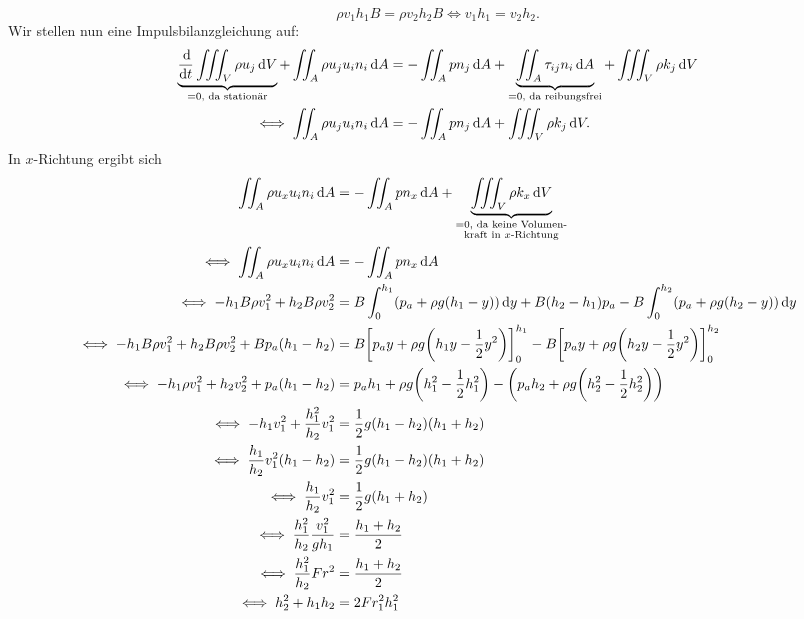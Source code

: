 \documentclass{exercise}
\begin{document}
\begin{enumerate}
        \[
            \rho v_1 h_1 B = \rho v_2 h_2 B \iff v_1 h_1 = v_2 h_2.
        \]
        Wir stellen nun eine Impulsbilanzgleichung auf:
        \begin{align*}
            \underbrace{\frac{\d}{\d t}\iiint_V \rho u_j\d V}_{= 0\text{, da stationär}} + \iint_A \rho u_j u_i n_i\d A &= -\iint_A pn_j\d A + \underbrace{\iint_A \tau_{ij}n_i\d A}_{= 0\text{, da reibungsfrei}} + \iiint_V \rho k_j\d V\\
            \iff \iint_A \rho u_j u_i n_i\d A &= -\iint_A pn_j\d A + \iiint_V \rho k_j\d V.
        \end{align*}
        In \(x\)-Richtung ergibt sich
        \begin{align*}
            \iint_A \rho u_x u_i n_i\d A &= -\iint_A pn_x\d A + \underbrace{\iiint_V \rho k_x\d V}_{\substack{= 0\text{, da keine Volumen-}\\\text{kraft in }x\text{-Richtung}}}\\
            \iff \iint_A \rho u_x u_i n_i\d A &= -\iint_A pn_x\d A\\
            \iff -h_1 B\rho v_1^2 + h_2 B\rho v_2^2 &= B\int_0^{h_1}\parentheses*{p_a + \rho g\parentheses*{h_1 - y}}\d y + B\parentheses*{h_2 - h_1}p_a - B\int_0^{h_2}\parentheses*{p_a + \rho g\parentheses*{h_2 - y}}\d y\\
            \iff -h_1 B\rho v_1^2 + h_2 B\rho v_2^2 + Bp_a\parentheses*{h_1 - h_2} &= B\brackets*{p_a y + \rho g\parentheses*{h_1 y - \frac{1}{2}y^2}}_0^{h_1} - B\brackets*{p_a y + \rho g\parentheses*{h_2 y - \frac{1}{2}y^2}}_0^{h_2}\\
            \iff -h_1 \rho v_1^2 + h_2 v_2^2 + p_a\parentheses*{h_1 - h_2} &= p_a h_1 + \rho g\parentheses*{h_1^2 - \frac{1}{2}h_1^2} - \parentheses*{p_a h_2 + \rho g\parentheses*{h_2^2 - \frac{1}{2}h_2^2}}\\
            \iff -h_1 v_1^2 + \frac{h_1^2}{h_2}v_1^2 &= \frac{1}{2}g\parentheses*{h_1 - h_2}\parentheses*{h_1 + h_2}\\
            \iff \frac{h_1}{h_2}v_1^2\parentheses*{h_1 - h_2} &= \frac{1}{2}g\parentheses*{h_1 - h_2}\parentheses*{h_1 + h_2}\\
            \iff \frac{h_1}{h_2}v_1^2 &= \frac{1}{2}g\parentheses*{h_1 + h_2}\\
            \iff \frac{h_1^2}{h_2}\frac{v_1^2}{gh_1} &= \frac{h_1 + h_2}{2}\\
            \iff \frac{h_1^2}{h_2}Fr^2 &= \frac{h_1 + h_2}{2}\\
            \iff h_2^2 + h_1 h_2 &= 2Fr_1^2 h_1^2\\

\end{align*}
\end{enumerate}
\end{document}
